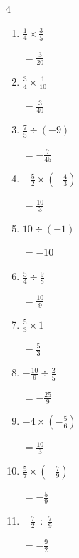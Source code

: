 \begin{multicols}{4}
\begin{enumerate}
        $\displaystyle =-\frac{18}{5}$

\columnbreak %

\resetques

  \item $\displaystyle \frac{1}{4}\times{}\frac{3}{5}$

        $\displaystyle =\frac{3}{20}$

  \item $\displaystyle \frac{3}{4}\times{}\frac{1}{10}$

        $\displaystyle =\frac{3}{40}$

  \item $\displaystyle \frac{7}{5}\div{}\left(-9\right)$

        $\displaystyle =-\frac{7}{45}$

  \item $\displaystyle -\frac{5}{2}\times{}\left(-\frac{4}{3}\right)$

        $\displaystyle =\frac{10}{3}$

  \item $\displaystyle 10\div{}\left(-1\right)$

        $\displaystyle =-10$

  \item $\displaystyle \frac{5}{4}\div{}\frac{9}{8}$

        $\displaystyle =\frac{10}{9}$

  \item $\displaystyle \frac{5}{3}\times{}1$

        $\displaystyle =\frac{5}{3}$

  \item $\displaystyle -\frac{10}{9}\div{}\frac{2}{5}$

        $\displaystyle =-\frac{25}{9}$

  \item $\displaystyle -4\times{}\left(-\frac{5}{6}\right)$

        $\displaystyle =\frac{10}{3}$

  \item $\displaystyle \frac{5}{7}\times{}\left(-\frac{7}{9}\right)$

        $\displaystyle =-\frac{5}{9}$

\columnbreak %

  \item $\displaystyle -\frac{7}{2}\div{}\frac{7}{9}$

        $\displaystyle =-\frac{9}{2}$


\end{enumerate}
\end{multicols}

